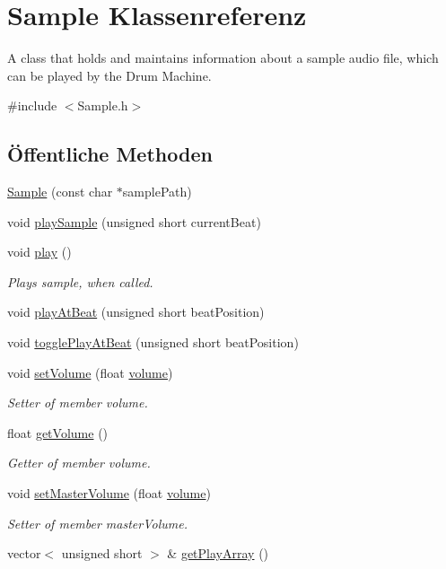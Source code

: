 \hypertarget{class_sample}{}\section{Sample Klassenreferenz}
\label{class_sample}


A class that holds and maintains information about a sample audio file, which can be played by the Drum Machine.  




{\ttfamily \#include $<$Sample.\+h$>$}

\subsection*{Öffentliche Methoden}
\begin{DoxyCompactItemize}
\item 
\hyperlink{class_sample_a7aea6b090998a430341aa6d1d6222c63}{Sample} (const char $\ast$sample\+Path)
\item 
void \hyperlink{class_sample_a720e0e4edc0eacfb6170951177eabc31}{play\+Sample} (unsigned short current\+Beat)
\item 
void \hyperlink{class_sample_a2ccc1c5571e54ba6725714cd795698f3}{play} ()
\begin{DoxyCompactList}\small\item\em Plays sample, when called. \end{DoxyCompactList}\item 
void \hyperlink{class_sample_a26322924f7a05091e13380c6494896da}{play\+At\+Beat} (unsigned short beat\+Position)
\item 
void \hyperlink{class_sample_a4bf009853c35f7a29955fa2554d8e799}{toggle\+Play\+At\+Beat} (unsigned short beat\+Position)
\item 
void \hyperlink{class_sample_ae298bfb5c8c1c3c867fa962e799a2fa5}{set\+Volume} (float \hyperlink{class_sample_a74a4b4799b2bdec9fdde363992b9cec8}{volume})
\begin{DoxyCompactList}\small\item\em Setter of member volume. \end{DoxyCompactList}\item 
float \hyperlink{class_sample_a9f3c251183832a53ec1967331d022575}{get\+Volume} ()
\begin{DoxyCompactList}\small\item\em Getter of member volume. \end{DoxyCompactList}\item 
void \hyperlink{class_sample_af8ad49b65a536c535393e3968516b871}{set\+Master\+Volume} (float \hyperlink{class_sample_a74a4b4799b2bdec9fdde363992b9cec8}{volume})
\begin{DoxyCompactList}\small\item\em Setter of member master\+Volume. \end{DoxyCompactList}\item 
vector$<$ unsigned short $>$ \& \hyperlink{class_sample_a5728b28ce6f6ee19a1b84eddded4fa97}{get\+Play\+Array} ()
\end{DoxyCompactItemize}
